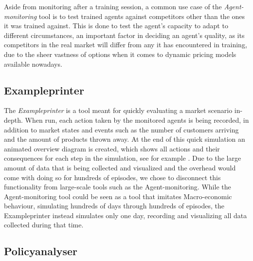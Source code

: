 Aside from monitoring after a training session, a common use case of the \emph{Agent-monitoring} tool is to test trained agents against competitors other than the ones it was trained against. This is done to test the agent's capacity to adapt to different circumstances, an important factor in deciding an agent's quality, as its competitors in the real market will differ from any it has encountered in training, due to the sheer vastness of options when it comes to dynamic pricing models available nowadays. %

\subsection{Exampleprinter}\label{subsec:Exampleprinter}

The \emph{Exampleprinter} is a tool meant for quickly evaluating a market scenario in-depth. When run, each action taken by the monitored agents is being recorded, in addition to market states and events such as the number of customers arriving and the amount of products thrown away. At the end of this quick simulation an animated overview diagram is created, which shows all actions and their consequences for each step in the simulation, see for example . Due to the large amount of data that is being collected and visualized and the overhead would come with doing so for hundreds of episodes, we chose to disconnect this functionality from large-scale tools such as the Agent-monitoring. While the Agent-monitoring tool could be seen as a tool that imitates Macro-economic behaviour, simulating hundreds of days through hundreds of episodes, the Exampleprinter instead simulates only one day, recording and visualizing all data collected during that time.

\subsection{Policyanalyser}\label{subsec:Policyanalyser}

